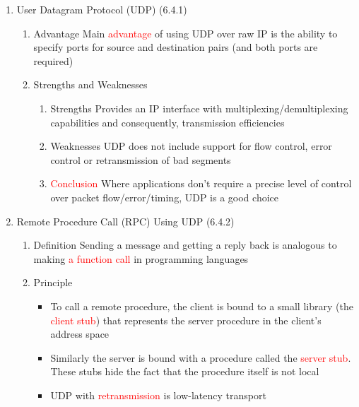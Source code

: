 \documentclass[a4paper,10pt]{article}
\newcommand{\red}[1]{\textcolor{red}{#1}}
\begin{document}
\begin{enumerate}
  \item User Datagram Protocol (UDP) (6.4.1)
    \begin{enumerate}
      \item Advantage
        \newline Main \red{advantage} of using UDP over raw IP is the ability to specify ports for source and destination pairs (and both ports are required)
      \item Strengths and Weaknesses
        \begin{enumerate}
          \item Strengths
            \newline Provides an IP interface with multiplexing/demultiplexing capabilities and consequently, transmission efficiencies
          \item Weaknesses
            \newline UDP does not include support for flow control, error control or retransmission of bad segments
          \item\red{Conclusion}
            \newline Where applications don't require a precise level of control over packet flow/error/timing, UDP is a good choice
        \end{enumerate}
    \end{enumerate}

  \item Remote Procedure Call (RPC) Using UDP (6.4.2)
    \begin{enumerate}
      \item Definition
        \newline Sending a message and getting a reply back is analogous to making \red{a function call} in programming languages
      \item Principle
        \begin{itemize}
          \item To call a remote procedure, the client is bound to a small library (the \red{client stub}) that represents the server procedure in the client's address space
          \item Similarly the server is bound with a procedure called the \red{server stub}. These stubs hide the fact that the procedure itself is not local
          \item UDP with \red{retransmission} is low-latency transport
        \end{itemize}
    \end{enumerate}


\end{enumerate}
\end{document}
